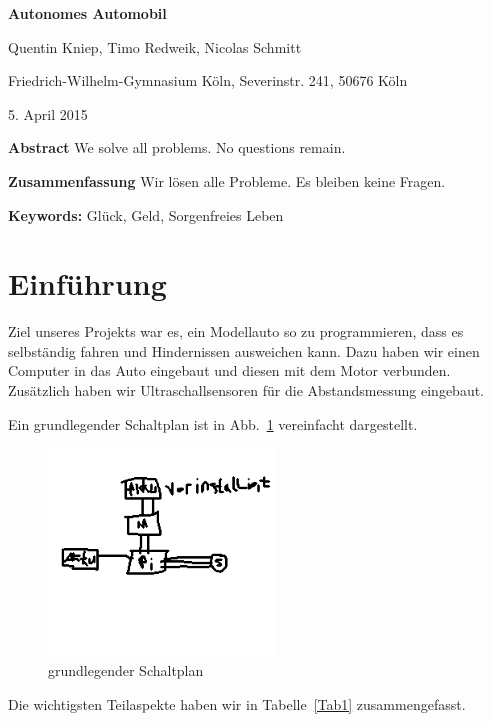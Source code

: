 \documentclass[a4paper,12pt]{article}
\begin{document}
{\Large\bf Autonomes Automobil}

\medskip

Quentin Kniep, Timo Redweik, Nicolas Schmitt

\medskip

Friedrich-Wilhelm-Gymnasium K\"oln, Severinstr. 241, 50676 K\"oln

\medskip

5. April  2015

\medskip

{\bf  Abstract}
{\small We solve all problems. No questions remain.}

\medskip

{\bf  Zusammenfassung}
{\small Wir l\"osen alle Probleme. Es bleiben keine Fragen.}

\medskip

{\bf  Keywords:}
{\small Gl\"uck, Geld, Sorgenfreies Leben}

\bigskip


\section{Einf\"uhrung}\label{sec1}

Ziel unseres Projekts war es, ein Modellauto so zu programmieren, dass es selbst\"andig fahren und Hindernissen ausweichen kann.
Dazu haben wir einen Computer in das Auto eingebaut und diesen mit dem Motor verbunden.
Zus\"atzlich haben wir Ultraschallsensoren f\"ur die Abstandsmessung eingebaut.

Ein grundlegender Schaltplan ist in Abb.~\ref{Fig1} vereinfacht dargestellt.

\begin{figure}[h]
	\centering
	\includegraphics[width=6cm]{./media/Fig1.png}
	\caption{grundlegender Schaltplan}
	\label{Fig1}
\end{figure}

Die wichtigsten Teilaspekte haben wir in Tabelle~\ref{Tab1} zusammengefasst.
\end{document}
